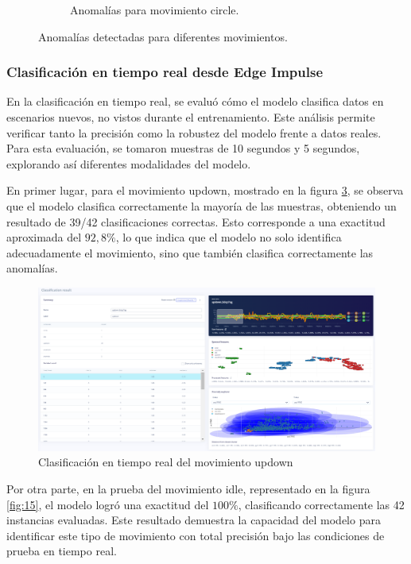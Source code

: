 \documentclass[12pt,a4paper]{article}
\begin{document}
\begin{itemize}
\begin{figure}[H]
\begin{subfigure}{0.31\textwidth}
        \caption{Anomalías para movimiento circle.}
        \label{fig:13}
    \end{subfigure}
    \caption{Anomalías detectadas para diferentes movimientos.}
    \label{fig:anomaly_detection}
\end{figure}
    
\end{itemize}

\subsubsection{Clasificación en tiempo real desde Edge Impulse}
En la clasificación en tiempo real, se evaluó cómo el modelo clasifica datos en escenarios nuevos, no vistos durante el entrenamiento. Este análisis permite verificar tanto la precisión como la robustez del modelo frente a datos reales. Para esta evaluación, se tomaron muestras de 10 segundos y 5 segundos, explorando así diferentes modalidades del modelo.

En primer lugar, para el movimiento updown, mostrado en la figura \ref{fig:14}, se observa que el modelo clasifica correctamente la mayoría de las muestras, obteniendo un resultado de 39/42 clasificaciones correctas. Esto corresponde a una exactitud aproximada del $92,8\%$, lo que indica que el modelo no solo identifica adecuadamente el movimiento, sino que también clasifica correctamente las anomalías.

\begin{figure}[H]
    \centering
    \includegraphics[width=0.6\linewidth]{Imagenes/live_updown.png}
    \caption{Clasificación en tiempo real del movimiento updown}
    \label{fig:14}
\end{figure}

Por otra parte, en la prueba del movimiento idle, representado en la figura \ref{fig:15}, el modelo logró una exactitud del $100\%$, clasificando correctamente las 42 instancias evaluadas. Este resultado demuestra la capacidad del modelo para identificar este tipo de movimiento con total precisión bajo las condiciones de prueba en tiempo real.
\end{document}
